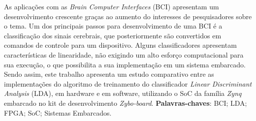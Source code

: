 \begin{resumo}

 \vspace{\onelineskip}
 As aplicações com as \textit{Brain Computer Interfaces} (BCI) apresentam um desenvolvimento crescente graças ao aumento do interesses de pesquisadores sobre o tema. Um dos principais passos para desenvolvimento de uma BCI é a classificação dos sinais cerebrais, que posteriormente são convertidos em comandos de controle para um dispositivo. Alguns classificadores apresentam características de linearidade, não exigindo um alto esforço computacional para sua execução, o que possibilita a sua implementação em um sistema embarcado. Sendo assim, este trabalho apresenta um estudo comparativo entre as implementações do algoritmo de treinamento  do classificador \textit{Linear Discriminant Analysis} (LDA), em hardware e em software, utilizando o SoC da família \textit{Zynq} embarcado no kit de desenvolvimento \textit{Zybo-board}.
 \noindent
 \newline
 \textbf{Palavras-chaves}: BCI; LDA; FPGA; SoC; Sistemas Embarcados.
\end{resumo}
